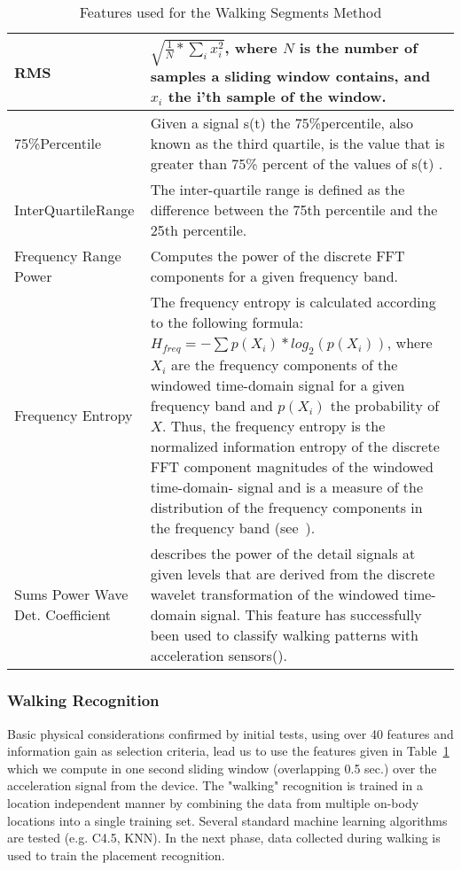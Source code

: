 \begin{table}
\caption{Features used for the Walking Segments Method}
\begin{tabular}{p{5cm} p{8cm}}
\toprule 
RMS& $\sqrt{\frac{1}{N}*\sum_i{x_i^2}}$, where $N$ is the number of
samples a sliding window contains, and $x_i$ the i'th sample of the
window.\\ \midrule

75\%Percentile& Given a signal s(t) the 75\%percentile,
also known as the third quartile, is the value that is greater than
75\% percent of the values of s(t) .\\
\midrule

InterQuartileRange& The inter-quartile range is defined as the
difference between the 75th percentile and the 25th
percentile.\\ \midrule

Frequency Range Power& Computes the power of the
discrete FFT components for a given frequency band. \\ 
\midrule

Frequency Entropy& The frequency entropy is calculated according to
the following formula: $H_{freq}=-\sum{p(X_i)*log_2(p(X_i))}$, where
$X_i$ are the frequency components of the windowed time-domain signal
for a given frequency band and $p(X_i)$ the probability of $X$.  Thus,
the frequency entropy is the normalized information entropy of the
discrete FFT component magnitudes of the windowed time-domain- signal
and is a measure of the distribution of the frequency components in
the frequency band (see~\cite{bao2003physical}).\\\midrule
Sums Power Wave Det. Coefficient&  describes the power of the detail signals
at given levels that are   derived from the discrete wavelet transformation of the windowed
time-domain signal.  This feature has
  successfully been used to classify walking
  patterns with  acceleration sensors(\cite{sekine2000}). \\

\bottomrule
\end{tabular}     
\label{table:featuresWalking}
\end{table}

\subsubsection{Walking Recognition}
Basic physical considerations confirmed by initial tests, using over
40 features and information gain as selection criteria, lead us
to use the features given in Table~\ref{table:featuresWalking}
which we compute in one second sliding window (overlapping 0.5 sec.) over the acceleration signal from the device.
The "walking" recognition is trained in a location independent manner
by combining the data from multiple on-body locations into a single training set.  
Several standard machine learning algorithms are tested (e.g. C4.5, KNN). In the next phase, data
collected during walking is used to train the placement recognition.

